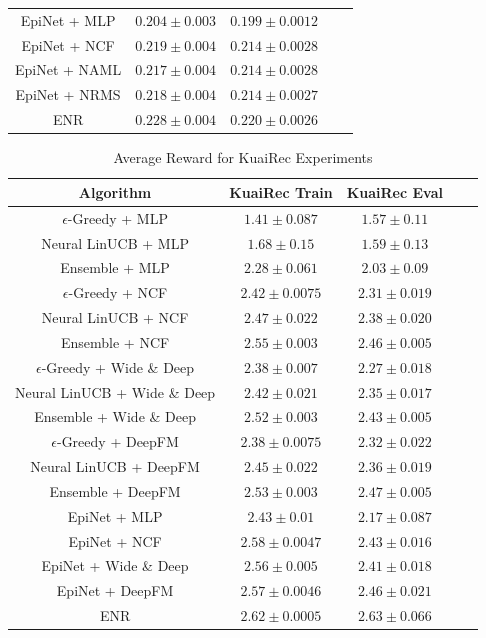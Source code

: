 \begin{table}[t!]
\begin{tabular}{ccccc}
    \midrule\midrule
    EpiNet + MLP & $0.204 \pm 0.003$ & $0.199 \pm 0.0012$\\
    EpiNet + NCF & $0.219 \pm 0.004$ & $0.214 \pm 0.0028$\\
    EpiNet + NAML & $0.217 \pm 0.004$ & $0.214 \pm 0.0028$\\
    EpiNet + NRMS & $0.218 \pm 0.004$ & $0.214 \pm 0.0027$\\
    \midrule
    ENR & $\mathbf{0.228 \pm 0.004}$ & $\mathbf{0.220 \pm 0.0026}$\\
  \bottomrule
\end{tabular}
\vspace{-0.15in}
\end{table}

\begin{table}[t!]
\small
  \caption{Average Reward for KuaiRec Experiments}
  \vspace{-0.1in}
  \label{tab:kuai_reward}
  \begin{tabular}{ccccc}
    \toprule
    Algorithm & KuaiRec Train & KuaiRec Eval\\
    \midrule 
    $\epsilon$-Greedy + MLP & $1.41 \pm 0.087$ & $1.57 \pm 0.11$\\
    Neural LinUCB + MLP & $1.68 \pm 0.15$ & $1.59 \pm 0.13$\\
    Ensemble + MLP & $2.28 \pm 0.061$ & $2.03 \pm 0.09$\\
    \midrule
    $\epsilon$-Greedy + NCF & $2.42 \pm 0.0075$ & $2.31 \pm 0.019$\\
    Neural LinUCB + NCF & $2.47 \pm 0.022$ & $2.38 \pm 0.020$\\
    Ensemble + NCF & $2.55 \pm 0.003$ & $2.46 \pm 0.005$\\
    \midrule
    $\epsilon$-Greedy + Wide \& Deep & $2.38 \pm 0.007$ & $2.27 \pm 0.018$\\
    Neural LinUCB + Wide \& Deep & $2.42 \pm 0.021$ & $2.35 \pm 0.017$\\
    Ensemble + Wide \& Deep & $2.52 \pm 0.003$ & $2.43 \pm 0.005$\\
    \midrule
    $\epsilon$-Greedy + DeepFM & $2.38 \pm 0.0075$ & $2.32 \pm 0.022$\\
    Neural LinUCB + DeepFM & $2.45 \pm 0.022$ & $2.36 \pm 0.019$\\
    Ensemble + DeepFM & $2.53 \pm 0.003$ & $2.47 \pm 0.005$\\
    \midrule\midrule
    EpiNet + MLP & $2.43 \pm 0.01$ & $2.17 \pm 0.087$\\
    EpiNet + NCF & $2.58 \pm 0.0047$ & $2.43 \pm 0.016$\\
    EpiNet + Wide \& Deep & $2.56 \pm 0.005$ & $2.41 \pm 0.018$\\
    EpiNet + DeepFM & $2.57 \pm 0.0046$ & $2.46 \pm 0.021$\\
    \midrule
    ENR & $\mathbf{2.62 \pm 0.0005}$ & $\mathbf{2.63 \pm 0.066}$\\
  \bottomrule
\end{tabular}
\vspace{-0.2in}
\end{table}


